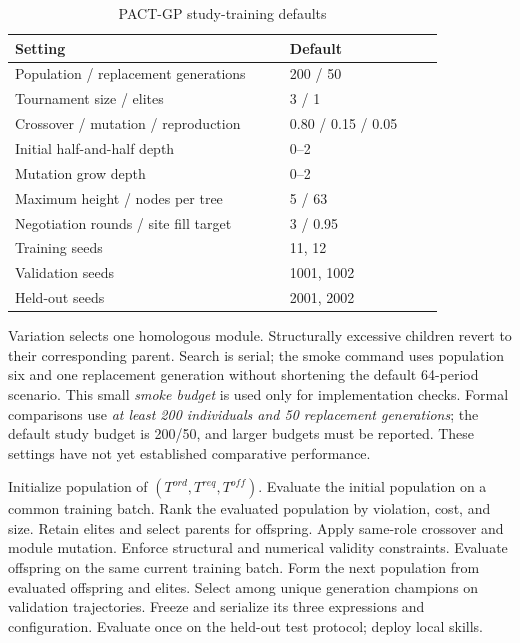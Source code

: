 \begin{table}[t]
\centering
\caption{PACT-GP study-training defaults}
\label{tab:search-defaults}
\footnotesize
\begin{tabular}{p{0.58\linewidth}p{0.32\linewidth}}
\toprule
Setting & Default \\
\midrule
Population / replacement generations & 200 / 50 \\
Tournament size / elites & 3 / 1 \\
Crossover / mutation / reproduction & 0.80 / 0.15 / 0.05 \\
Initial half-and-half depth & 0--2 \\
Mutation grow depth & 0--2 \\
Maximum height / nodes per tree & 5 / 63 \\
Negotiation rounds / site fill target & 3 / 0.95 \\
Training seeds & 11, 12 \\
Validation seeds & 1001, 1002 \\
Held-out seeds & 2001, 2002 \\
\bottomrule
\end{tabular}
\end{table}
Variation selects one homologous module. Structurally excessive children
revert to their corresponding parent. Search is serial; the smoke command
uses population six and one replacement generation without shortening the
default 64-period scenario. This small \emph{smoke budget} is used only for
implementation checks. Formal comparisons use \emph{at least 200 individuals
and 50 replacement generations}; the default study budget is 200/50, and
larger budgets must be reported. These settings have not yet established
comparative performance.

\begin{algorithm}[t]
\caption{PACT-GP policy search}
\label{alg:gp}
\begin{algorithmic}[1]
\STATE Initialize population of $(T^{ord},T^{req},T^{off})$.
\STATE Evaluate the initial population on a common training batch.
    \STATE Rank the evaluated population by violation, cost, and size.
    \STATE Retain elites and select parents for offspring.
    \STATE Apply same-role crossover and module mutation.
    \STATE Enforce structural and numerical validity constraints.
    \STATE Evaluate offspring on the same current training batch.
    \STATE Form the next population from evaluated offspring and elites.
\ENDFOR
\STATE Select among unique generation champions on validation trajectories.
\STATE Freeze and serialize its three expressions and configuration.
\STATE Evaluate once on the held-out test protocol; deploy local skills.
\end{algorithmic}
\end{algorithm}

